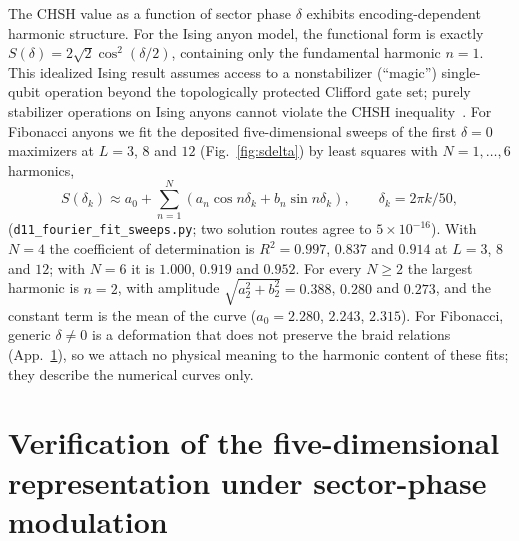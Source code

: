\documentclass[aps,pra,twocolumn,superscriptaddress,longbibliography,floatfix,nofootinbib]{revtex4-2}
\begin{document}
The CHSH value as a function of sector phase $\delta$ exhibits
encoding-dependent harmonic structure.
For the Ising anyon model, the functional form is exactly
$S(\delta) = 2\sqrt{2}\cos^2(\delta/2)$, containing only the
fundamental harmonic $n=1$. This idealized Ising result assumes
access to a nonstabilizer (``magic'') single-qubit operation beyond
the topologically protected Clifford gate set; purely stabilizer
operations on Ising anyons cannot violate the CHSH
inequality~\cite{HowardVala2012}.
For Fibonacci anyons we fit the deposited five-dimensional sweeps of
the first $\delta = 0$ maximizers at $L = 3$, $8$ and $12$
(Fig.~\ref{fig:sdelta}) by least squares with $N = 1,\dots,6$ harmonics,
\begin{equation}
S(\delta_k) \approx a_0 + \sum_{n=1}^{N}
\left(a_n\cos n\delta_k + b_n\sin n\delta_k\right),
\qquad \delta_k = 2\pi k/50,
\label{eq:fourier}
\end{equation}
(\texttt{d11\_fourier\_fit\_sweeps.py}; two solution routes agree to
$5\times10^{-16}$). With $N = 4$ the coefficient of determination is
$R^2 = 0.997$, $0.837$ and $0.914$ at $L = 3$, $8$ and $12$; with
$N = 6$ it is $1.000$, $0.919$ and $0.952$. For every $N \geq 2$ the
largest harmonic is $n = 2$, with amplitude
$\sqrt{a_2^2+b_2^2} = 0.388$, $0.280$ and $0.273$, and the constant term
is the mean of the curve ($a_0 = 2.280$, $2.243$, $2.315$). For
Fibonacci, generic $\delta \neq 0$ is a deformation that does not
preserve the braid relations (App.~\ref{app:algebra}), so we attach no
physical meaning to the harmonic content of these fits; they describe
the numerical curves only.

\section{Verification of the five-dimensional representation under sector-phase modulation}
\label{app:algebra}
\end{document}
